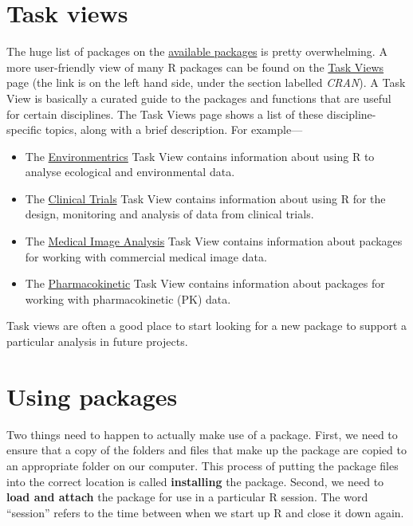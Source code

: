 \documentclass[
]{book}
\providecommand{\tightlist}{%
  \setlength{\itemsep}{0pt}\setlength{\parskip}{0pt}}
\begin{document}
\hypertarget{task-views}{%
\section{Task views}\label{task-views}}

The huge list of packages on the \href{http://cran.r-project.org/web/packages/available_packages_by_name.html}{available packages} is pretty overwhelming. A more user-friendly view of many R packages can be found on the \href{http://cran.r-project.org/web/views/}{Task Views} page (the link is on the left hand side, under the section labelled \emph{CRAN}). A Task View is basically a curated guide to the packages and functions that are useful for certain disciplines. The Task Views page shows a list of these discipline-specific topics, along with a brief description. For example---

\begin{itemize}
\tightlist
\item
  The \href{http://cran.r-project.org/web/views/Environmetrics.html}{Environmentrics} Task View contains information about using R to analyse ecological and environmental data.
\item
  The \href{https://cran.r-project.org/web/views/ClinicalTrials.html}{Clinical Trials} Task View contains information about using R for the design, monitoring and analysis of data from clinical trials.
\item
  The \href{https://cran.r-project.org/web/views/MedicalImaging.html}{Medical Image Analysis} Task View contains information about packages for working with commercial medical image data.
\item
  The \href{https://cran.r-project.org/web/views/Pharmacokinetics.html}{Pharmacokinetic} Task View contains information about packages for working with pharmacokinetic (PK) data.
\end{itemize}

Task views are often a good place to start looking for a new package to support a particular analysis in future projects.

\hypertarget{use-packages}{%
\section{Using packages}\label{use-packages}}

Two things need to happen to actually make use of a package. First, we need to ensure that a copy of the folders and files that make up the package are copied to an appropriate folder on our computer. This process of putting the package files into the correct location is called \textbf{installing} the package. Second, we need to \textbf{load and attach} the package for use in a particular R session. The word ``session'' refers to the time between when we start up R and close it down again.
\end{document}
